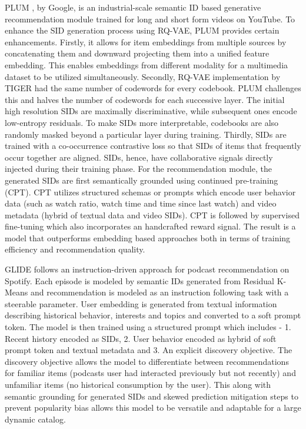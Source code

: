 \documentclass[11pt,a4paper]{article}
\begin{document}
PLUM \cite{2025PLUM_he2025plumadaptingpretrainedlanguage}, by Google, is an industrial-scale semantic ID based generative recommendation module trained for long and short form videos on YouTube. To enhance the SID generation process using RQ-VAE, PLUM provides certain enhancements. Firstly, it allows for item embeddings from multiple sources by concatenating them and downward projecting them into a unified feature embedding. This enables embeddings from different modality for a multimedia dataset to be utilized simultaneously. Secondly, RQ-VAE implementation by TIGER had the same number of codewords for every codebook. PLUM challenges this and halves the number of codewords for each successive layer. The initial high resolution SIDs are maximally discriminative, while subsequent ones encode low-entropy residuals. To make SIDs more interpretable, codebooks are also randomly masked beyond a particular layer during training. Thirdly, SIDs are trained with a co-occurrence contrastive loss so that SIDs of items that frequently occur together are aligned. SIDs, hence, have collaborative signals directly injected during their training phase. For the recommendation module, the generated SIDs are first semantically grounded using continued pre-training (CPT). CPT utilizes structured schemas or prompts which encode user behavior data (such as watch ratio, watch time and time since last watch) and video metadata (hybrid of textual data and video SIDs). CPT is followed by supervised fine-tuning which also incorporates an handcrafted reward signal. The result is a model that outperforms embedding based approaches both in terms of training efficiency and recommendation quality.

GLIDE \cite{2026GLIDE_damico2026deployingsemanticidbasedgenerative} follows an instruction-driven approach for podcast recommendation on Spotify. Each episode is modeled by semantic IDs generated from Residual K-Means and recommendation is modeled as an instruction following task with a steerable parameter. User embedding is generated from textual information describing historical behavior, interests and topics and converted to a soft prompt token. The model is then trained using a structured prompt which includes -  1. Recent history encoded as SIDs, 2. User behavior encoded as hybrid of soft prompt token and textual metadata and 3. An explicit discovery objective. The discovery objective allows the model to differentiate between recommendations for familiar items (podcasts user had interacted previously but not recently) and unfamiliar items (no historical consumption by the user). This along with semantic grounding for generated SIDs and skewed prediction mitigation steps to prevent popularity bias allows this model to be versatile and adaptable for a large dynamic catalog.
\end{document}

